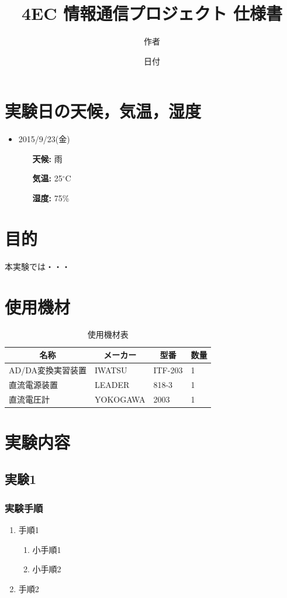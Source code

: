 \documentclass[10.5pt]{jsarticle}
\title{4EC 情報通信プロジェクト 仕様書}
\date{日付}
\author{作者}
\begin{document}
\maketitle
\thispagestyle{fancy}

\section{実験日の天候，気温，湿度}
\begin{itemize}
	\item{2015/9/23(金)}
		\begin{itemize}
			\item[\textbf{天候:}]{雨}
			\item[\textbf{気温:}]{25$^\circ$C}
			\item[\textbf{湿度:}]{75\%}
		\end{itemize}
\end{itemize}

\section{目的}
本実験では・・・

\section{使用機材}
\begin{table}[H]
	\centering
	\caption{使用機材表} \label{Equipments}
	\begin{tabular}{|l|l|l|l|} 
		\hline
		\multicolumn{1}{|c|}{\textbf{名称}}&\multicolumn{1}{c|}{\textbf{メーカー}}&\multicolumn{1}{c|}{\textbf{型番}}&\multicolumn{1}{c|}{\textbf{数量}}\\\hline\hline
		AD/DA変換実習装置&IWATSU&ITF-203&1\\\hline
		直流電源装置&LEADER&818-3&1\\\hline
		直流電圧計&YOKOGAWA&2003&1\\\hline
	\end{tabular}
\end{table}

\newpage

\section{実験内容}
\subsection{実験1}
\subsubsection{実験手順}
\begin{enumerate}
\item{手順1}
	\begin{enumerate}
		\item{小手順1}
		\item{小手順2}
	\end{enumerate}
\item{手順2}
\end{enumerate}
\end{document}
